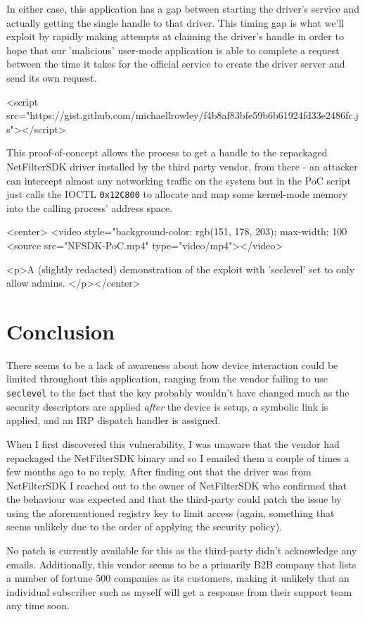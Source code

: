 In either case, this application has a gap between starting the driver's service and actually getting the single handle to that driver. This
            timing gap is what we'll exploit by rapidly making attempts at claiming the driver's handle in order to hope that our 'malicious' user-mode application
            is able to complete a request between the time it takes for the official service to create the driver server and send its own request.

\begin{rawhtml}
<script src="https://gist.github.com/michaellrowley/f4b8af83bfe59b6b61924fd33e2486fc.js"></script>
\end{rawhtml}

This proof-of-concept allows the process to get a handle to the repackaged NetFilterSDK driver installed by the third party vendor, from there - an attacker can
            intercept almost any networking traffic on the system but in the PoC script just calls the IOCTL \texttt{0x12C800} to allocate
            and map some kernel-mode memory into the calling process' address space.

\begin{rawhtml}
<center>
            <video style="background-color: rgb(151, 178, 203); max-width: 100%
                <source src="NFSDK-PoC.mp4" type="video/mp4"></video>
            
            <p>A (slightly redacted) demonstration of the exploit with 'seclevel' set to only allow admins.
        </p></center>
\end{rawhtml}

\section{Conclusion}

There seems to be a lack of awareness about how device interaction could be limited throughout this application, ranging from the vendor failing to use \texttt{seclevel}
            to the fact that the key probably wouldn't have changed much as the security descriptors are applied \textit{after} the
            device is setup, a symbolic link is applied, and an IRP dispatch handler is assigned.

When I first discovered this vulnerability, I was unaware that the vendor had repackaged the NetFilterSDK binary and so I emailed them a couple of times a few months ago
            to no reply.
            After finding out that the driver was from NetFilterSDK I reached out to the owner of NetFilterSDK who confirmed that the behaviour was expected and that the third-party could
            patch the issue by using the aforementioned registry key to limit access (again, something that seems unlikely due to the order of applying the security policy).

No patch is currently available for this as the third-party didn't acknowledge any emails. Additionally, this vendor seems to be a primarily B2B company that lists
            a number of fortune 500 companies as its customers, making it unlikely that an individual subscriber such as myself will get a response from their support team any time soon.
